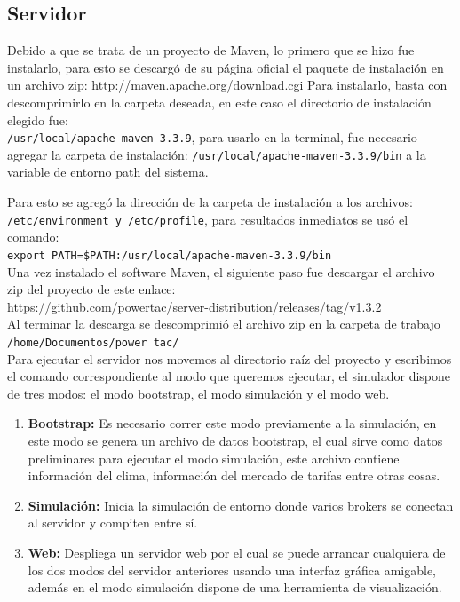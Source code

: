 \subsection{Servidor}

Debido a que se trata de un proyecto de Maven, lo primero que se hizo fue instalarlo, para esto se descargó de su página oficial el paquete de instalación en un archivo zip: \textsf{http://maven.apache.org/download.cgi}
Para instalarlo, basta con descomprimirlo en la carpeta deseada, en este caso el directorio de instalación elegido fue:\\ \texttt{/usr/local/apache-maven-3.3.9}, 
para usarlo en la terminal, fue necesario agregar la carpeta de instalación: \texttt{/usr/local/apache-maven-3.3.9/bin} 
a la variable de entorno path del sistema.

Para esto se agregó la dirección de la carpeta de instalación a los archivos:\\
\texttt{/etc/environment y /etc/profile}, para resultados inmediatos se usó el comando:\\
\texttt{export PATH=\$PATH:/usr/local/apache-maven-3.3.9/bin}\\

Una vez instalado el software Maven, el siguiente paso fue descargar el archivo zip del proyecto de este enlace:\\ \textsf{https://github.com/powertac/server-distribution/releases/tag/v1.3.2}\\
Al terminar la descarga se descomprimió el archivo zip en la carpeta de trabajo\\
\texttt{/home/Documentos/power tac/} \\
Para ejecutar el servidor nos movemos al directorio raíz del proyecto y escribimos el comando correspondiente al modo que queremos ejecutar, el simulador dispone de tres modos: el modo bootstrap, el modo simulación y el modo web.

\begin{enumerate}
	\item \textbf{Bootstrap:} Es necesario correr este modo previamente a la simulación, en este modo se genera un archivo de datos bootstrap, el cual sirve como datos preliminares para ejecutar el modo simulación, este archivo contiene información del clima, información del mercado de tarifas entre otras cosas.

	\item \textbf{Simulación:} Inicia la simulación de entorno donde varios brokers se conectan al servidor y compiten entre sí.
	\item \textbf{Web: } Despliega un servidor web por el cual se puede arrancar cualquiera de los dos modos del servidor anteriores usando una interfaz gráfica amigable, además en el modo simulación dispone de una herramienta de visualización.
\end{enumerate}


